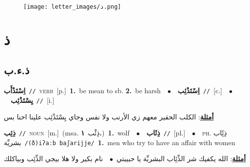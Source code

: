 \documentclass[10pt,a4paper,twoside]{article} %
\begin{document}
\begin{figure*}[t!]\centering\texttt{[image: letter\_images/ذ.png]}\end{figure*}
\color{white}

 \section*{\foreignlanguage{arabic}{ذ}} 
 \begin{multicols}{2} 

%
\color{black}
\vspace{-3mm}
\subsection*{\color{blue}\foreignlanguage{arabic}{ذ.ء.ب}\color{blue}{}} 

{\setlength\topsep{0pt}\textbf{\foreignlanguage{arabic}{اِسْتَذْأَب}}\ {\color{gray}\texttt{//}\color{black}}\ \textsc{verb}\ [p.]\ \textbf{1.}~be mean to sb.  \textbf{2.}~be harsh\ \ $\bullet$\ \ \setlength\topsep{0pt}\textbf{\foreignlanguage{arabic}{اِسْتَذْئِب}}\ {\color{gray}\texttt{//}\color{black}}\ [c.]\ \ $\bullet$\ \ \setlength\topsep{0pt}\textbf{\foreignlanguage{arabic}{يِسْتَذْئِب}}\ {\color{gray}\texttt{//}\color{black}}\ [i.]\  \begin{flushright}\color{gray}\foreignlanguage{arabic}{\textbf{\underline{\foreignlanguage{arabic}{أمثلة}}}: الكلب الحقير معهم زي الأرنب ولا نفس وجاي يِسْتَذْئِب علينا احنا بس}\end{flushright}\color{black}} \vspace{2mm}

{\setlength\topsep{0pt}\textbf{\foreignlanguage{arabic}{ذِئِب}}\ {\color{gray}\texttt{//}\color{black}}\ \textsc{noun}\ [m.]\ \color{gray}(msa. \foreignlanguage{arabic}{ذِئْب}~\foreignlanguage{arabic}{\textbf{١.}})\color{black}\ \textbf{1.}~wolf\ \ $\bullet$\ \ \setlength\topsep{0pt}\textbf{\foreignlanguage{arabic}{ذِئَاب}}\ {\color{gray}\texttt{//}\color{black}}\ [pl.]\ \ $\bullet$\ \ \textsc{ph.} \color{gray} \foreignlanguage{arabic}{ذِئَِاب بشريِّة}\color{black}\ {\color{gray}\texttt{/{\sffamily (ð)iʔaːb baʃarijje}/}\color{black}}\ \textbf{1.}~men who try to have an affair with women\  \begin{flushright}\color{gray}\foreignlanguage{arabic}{\textbf{\underline{\foreignlanguage{arabic}{أمثلة}}}: الله يكفيك شر الذِّئِاب البشريِّة يا حبيبتي\ $\bullet$\ \  نام بكير ولا هلا بيجي الذِّئِب وبياكلك}\end{flushright}\color{black}} \vspace{2mm}


\end{multicols}
\end{document}
